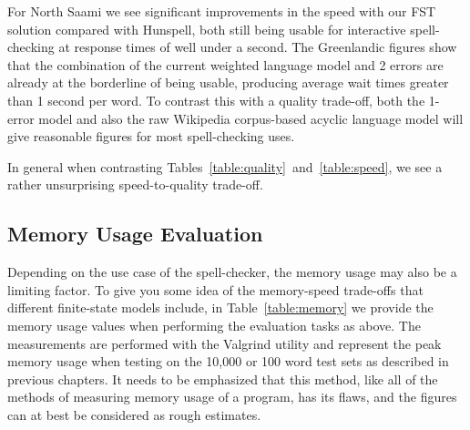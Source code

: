 \documentclass[a4paper,12pt]{article}
\begin{document}
For North Saami we see  significant improvements in the speed with our FST
solution compared with Hunspell, both still being usable for interactive
spell-checking at response times of well under a second. The Greenlandic
figures show that the combination of the current weighted language model and 2
errors are already at the borderline of being usable, producing average wait
times greater than 1 second per word. To contrast this with a quality
trade-off, both the 1-error model and also the raw Wikipedia corpus-based
acyclic language model will give reasonable figures for most spell-checking
uses.

In general when contrasting
Tables~\ref{table:quality}~and~\ref{table:speed}, we see a rather unsurprising
speed-to-quality trade-off. 


%

\subsection{Memory Usage Evaluation}

Depending on the use case of the spell-checker, the memory usage may also be a
limiting factor. To give you some idea of the memory-speed trade-offs that
different finite-state models include, in Table~\ref{table:memory} we provide
the memory usage values when performing the evaluation tasks as above. The
measurements are performed with the Valgrind utility and represent the peak
memory usage when testing on the 10,000 or 100 word test sets as described in
previous chapters. It needs to be emphasized that this method, like all of
the methods of measuring memory usage of a program, has its flaws, and the
figures can at best be considered as rough estimates.
\end{document}

